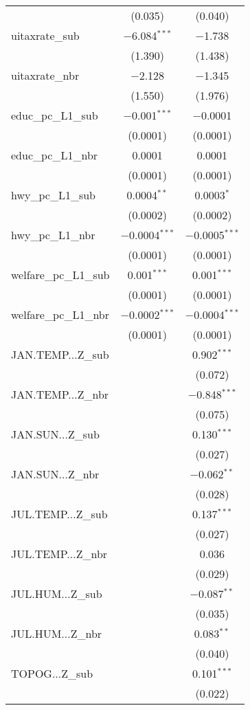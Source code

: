 \begin{table}[!htbp]
\begin{tabular}{@{\extracolsep{5pt}}lcc}
  & (0.035) & (0.040) \\ 
  uitaxrate\_sub & $-$6.084$^{***}$ & $-$1.738 \\ 
  & (1.390) & (1.438) \\ 
  uitaxrate\_nbr & $-$2.128 & $-$1.345 \\ 
  & (1.550) & (1.976) \\ 
  educ\_pc\_L1\_sub & $-$0.001$^{***}$ & $-$0.0001 \\ 
  & (0.0001) & (0.0001) \\ 
  educ\_pc\_L1\_nbr & 0.0001 & 0.0001 \\ 
  & (0.0001) & (0.0001) \\ 
  hwy\_pc\_L1\_sub & 0.0004$^{**}$ & 0.0003$^{*}$ \\ 
  & (0.0002) & (0.0002) \\ 
  hwy\_pc\_L1\_nbr & $-$0.0004$^{***}$ & $-$0.0005$^{***}$ \\ 
  & (0.0001) & (0.0001) \\ 
  welfare\_pc\_L1\_sub & 0.001$^{***}$ & 0.001$^{***}$ \\ 
  & (0.0001) & (0.0001) \\ 
  welfare\_pc\_L1\_nbr & $-$0.0002$^{***}$ & $-$0.0004$^{***}$ \\ 
  & (0.0001) & (0.0001) \\ 
  JAN.TEMP...Z\_sub &  & 0.902$^{***}$ \\ 
  &  & (0.072) \\ 
  JAN.TEMP...Z\_nbr &  & $-$0.848$^{***}$ \\ 
  &  & (0.075) \\ 
  JAN.SUN...Z\_sub &  & 0.130$^{***}$ \\ 
  &  & (0.027) \\ 
  JAN.SUN...Z\_nbr &  & $-$0.062$^{**}$ \\ 
  &  & (0.028) \\ 
  JUL.TEMP...Z\_sub &  & 0.137$^{***}$ \\ 
  &  & (0.027) \\ 
  JUL.TEMP...Z\_nbr &  & 0.036 \\ 
  &  & (0.029) \\ 
  JUL.HUM...Z\_sub &  & $-$0.087$^{**}$ \\ 
  &  & (0.035) \\ 
  JUL.HUM...Z\_nbr &  & 0.083$^{**}$ \\ 
  &  & (0.040) \\ 
  TOPOG...Z\_sub &  & 0.101$^{***}$ \\ 
  &  & (0.022) \\ 

\end{tabular}
\end{table}
